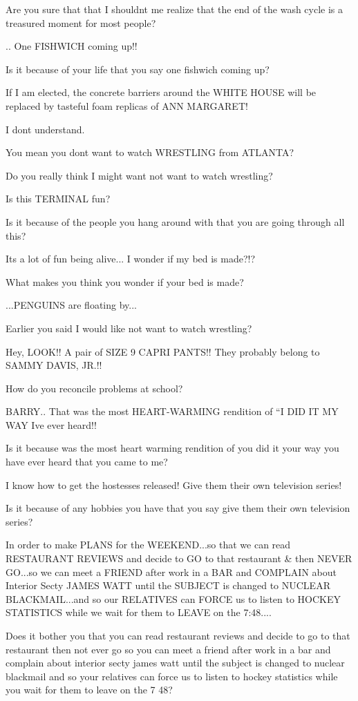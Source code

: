 \documentclass[cropmarks, frame, english]{idamasterthesis}
\begin{document}
Are you sure that that I shouldnt me realize that the end of the wash
cycle is a treasured moment for most people?

..  One FISHWICH coming up!!

Is it because of your life that you say one fishwich coming up?

If I am elected, the concrete barriers around the WHITE HOUSE
 will be replaced by tasteful foam replicas of ANN MARGARET!

I dont understand.

You mean you dont want to watch WRESTLING from ATLANTA?

Do you really think I might want not want to watch wrestling?

Is this TERMINAL fun?

Is it because of the people you hang around with that you are going
through all this?

Its a lot of fun being alive...  I wonder if my bed is made?!?

What makes you think you wonder if your bed is made?

...PENGUINS are floating by...

Earlier you said I would like not want to watch wrestling?

Hey, LOOK!!  A pair of SIZE 9 CAPRI PANTS!!  They probably belong to
 SAMMY DAVIS, JR.!!

How do you reconcile problems at school?

BARRY..  That was the most HEART-WARMING rendition of
 ``I DID IT MY WAY Ive ever heard!!

Is it because was the most heart warming rendition of you did it your
way you have ever heard that you came to me?

I know how to get the hostesses released!  Give them their own
 television series!

Is it because of any hobbies you have that you say give them their own
television series?

In order to make PLANS for the WEEKEND...so that we can read RESTAURANT
 REVIEWS and decide to GO to that restaurant \& then NEVER GO...so we can
 meet a FRIEND after work in a BAR and COMPLAIN about Interior Secty
 JAMES WATT until the SUBJECT is changed to NUCLEAR BLACKMAIL...and so
 our RELATIVES can FORCE us to listen to HOCKEY STATISTICS while we
 wait for them to LEAVE on the 7:48....

Does it bother you that you can read restaurant reviews and decide to
go to that restaurant then not ever go so you can meet a friend after
work in a bar and complain about interior secty james watt until the
subject is changed to nuclear blackmail and so your relatives can
force us to listen to hockey statistics while you wait for them to
leave on the 7 48?
\end{document}

